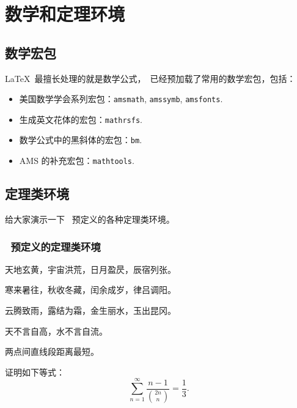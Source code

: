 \chapter{数学和定理环境}
\label{cha:theorem}
\section{数学宏包}
\LaTeX\ 最擅长处理的就是数学公式，\shuthesis\ 已经预加载了常用的数学宏包，包括：
\begin{itemize}
\item 美国数学学会系列宏包：\texttt{amsmath}, \texttt{amssymb}, \texttt{amsfonts}.
\item 生成英文花体的宏包：\texttt{mathrsfs}.
\item 数学公式中的黑斜体的宏包：\texttt{bm}.
\item AMS 的补充宏包：\texttt{mathtools}.
\end{itemize}

\section{定理类环境}
给大家演示一下 \shuthesis\ 预定义的各种定理类环境。

\subsection{\shuthesis\ 预定义的定理类环境}
\begin{assumption}
天地玄黄，宇宙洪荒，日月盈昃，辰宿列张。
\end{assumption}

\begin{definition}
寒来暑往，秋收冬藏，闰余成岁，律吕调阳。
\end{definition}

\begin{proposition}
云腾致雨，露结为霜，金生丽水，玉出昆冈。
\end{proposition}

\begin{remark}
天不言自高，水不言自流。
\end{remark}

\begin{axiom}
两点间直线段距离最短。 
\end{axiom}

\begin{lemma}
证明如下等式：
\[
\sum_{n=1}^{\infty}\frac{n-1}{\binom{2n}{n}}=\frac{1}{3}.
\]
\end{lemma}

